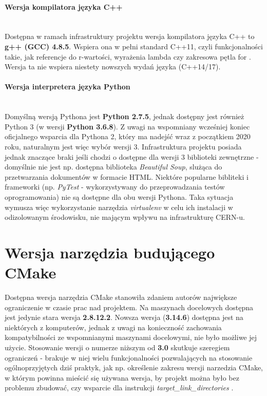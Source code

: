 \paragraph*{Wersja kompilatora języka C++}\mbox{}\\
Dostępna w ramach infrastruktury projektu wersja kompilatora języka C++ to \textbf{g++ (GCC) 4.8.5}. Wspiera ona w pełni standard C++11, czyli funkcjonalności takie, jak referencje do r-wartości, wyrażenia lambda czy zakresowa pętla for \cite{GCC48}. Wersja ta nie wspiera niestety nowszych wydań języka (C++14/17).

\paragraph*{Wersja interpretera języka Python}\mbox{}\\
Domyślną wersją Pythona jest \textbf{Python 2.7.5}, jednak dostępny jest również Python 3 (w wersji \textbf{Python 3.6.8}). Z uwagi na wspomniany wcześniej koniec oficjalnego wsparcia dla Pythona 2, który ma nadejść wraz z początkiem 2020 roku, naturalnym jest więc wybór wersji 3. Infrastruktura projektu posiada jednak znaczące braki jeśli chodzi o dostępne dla wersji 3 biblioteki zewnętrzne - domyślnie nie jest np. dostępna biblioteka \textit{Beautiful Soup}, slużąca do przetwarzania dokumentów w formacie HTML. Niektóre popularne bibliteki i frameworki (np. \textit{PyTest} - wykorzystywany do przeprowadzania testów oprogramowania) nie są dostępne dla obu wersji Pythona. Taka sytuacja wymusza więc wykorzystanie narzędzia \textit{virtualenv} w celu ich instalacji w odizolowanym środowisku, nie mającym wpływu na infrastrukturę CERN-u.

\section{Wersja narzędzia budującego CMake}
Dostępna wersja narzędzia CMake stanowiła zdaniem autorów największe ograniczenie w czasie prac nad projektem. Na maszynach docelowych dostępna jest jedynie stara wersja \textbf{2.8.12.2}. Nowsza wersja (\textbf{3.14.6}) dostępna jest na niektórych z komputerów, jednak z uwagi na konieczność zachowania kompatybilności ze wspomnianymi maszynami docelowymi, nie było możliwe jej użycie. Stosowanie wersji o numerze niższym od \textbf{3.0} skutkuje szeregiem ograniczeń - brakuje w niej wielu funkcjonalności pozwalających na stosowanie ogólnoprzyjętych dziś praktyk, jak np. określenie zakresu wersji narzedzia CMake, w którym powinna mieścić się używana wersja, by projekt można było bez problemu zbudować, czy wsparcie dla instrukcji \textit{target\_link\_directories} \cite{NewInCMake}.

